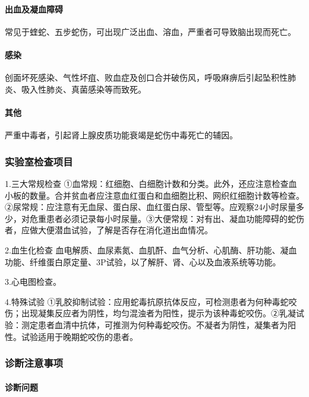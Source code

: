 \paragraph{出血及凝血障碍}

常见于蝰蛇、五步蛇伤，可出现广泛出血、溶血，严重者可导致脑出现而死亡。

\paragraph{感染}

创面坏死感染、气性坏疽、败血症及创口合并破伤风，呼吸麻痹后引起坠积性肺炎、吸入性肺炎、真菌感染等而致死。

\paragraph{其他}

严重中毒者，引起肾上腺皮质功能衰竭是蛇伤中毒死亡的辅因。

\subsubsection{实验室检查项目}

1.三大常规检查
①血常规：红细胞、白细胞计数和分类。此外，还应注意检查血小板的数量。合并贫血者应注意血红蛋白和血细胞比积、网织红细胞计数等检查。②尿常规：应注意有无血尿、蛋白尿、血红蛋白尿、管型等。应观察24小时尿量多少，对危重患者必须记录每小时尿量。③大便常规：对有出、凝血功能障碍的蛇伤者，应做大便潜血试验，了解是否存在消化道出血情况。

2.血生化检查
血电解质、血尿素氮、血肌酐、血气分析、心肌酶、肝功能、凝血功能、纤维蛋白原定量、3P试验，以了解肝、肾、心以及血液系统等功能。

3.心电图检查。

4.特殊试验
①乳胶抑制试验：应用蛇毒抗原抗体反应，可检测患者为何种毒蛇咬伤；出现凝集反应者为阴性，均匀混浊者为阳性，提示为该种毒蛇咬伤。②乳凝试验：测定患者血清中抗体，可推测为何种毒蛇咬伤。不凝者为阴性，凝集者为阳性。试验适用于晚期蛇咬伤的患者。

\subsubsection{诊断注意事项}

\paragraph{诊断问题}

